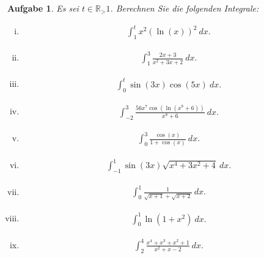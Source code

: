 \documentclass[a4paper, 20]{exam}
\newtheorem{ex}{Aufgabe}
\begin{document}
\begin{ex} Es sei $t \in \mathbb{R}_>1$. Berechnen Sie die folgenden Integrale:
\begin{enumerate}[i)]
\item \begin{align*}
\int_1^t x^2 ( \ln(x))^2 ~dx.
\end{align*}
\item \begin{align*}
\int_1^3 \frac{2x+3}{x^2+3x+2}~dx.
\end{align*}
\item \begin{align*}
\int_0^t \sin(3x) \cos(5x)~dx .
\end{align*}
\item \begin{align*}
\int_{-2}^3 \frac{56x^7 \cos( \ln (x^8 + 6))}{x^8+6}~dx.
\end{align*}
\item \begin{align*}
\int_0^3 \frac{\cos (x)}{1+\cos(x)}~dx.
\end{align*}
\item \begin{align*}
\int_{-1}^1 \sin(3x) \sqrt{x^4+3x^2 +4} ~dx.
\end{align*}
\item \begin{align*}
\int_0^1 \frac{1}{\sqrt{x+1}+\sqrt{x+2}}~dx.
\end{align*}
\item \begin{align*}
\int_0^1 \ln (1 +x^2 )~dx .
\end{align*}
\item \begin{align*}
\int_2^4 \frac{x^4 +x^3 +x^2+1}{x^2+x-2} ~dx.
\end{align*}
\end{enumerate}
\end{ex}
\end{document}
